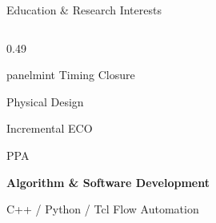 \documentclass[aspectratio=169,10pt]{beamer}
\begin{document}
\begin{frame}{Education \& Research Interests}
\begin{columns}[T,onlytextwidth]
\begin{column}{0.49\textwidth}
\begin{beamercolorbox}[rounded=true,sep=0.20cm,wd=\linewidth]{panelmint}
        {\normalsize Timing Closure}\par
        {\normalsize Physical Design}\par
        {\normalsize Incremental ECO}\par
        {\normalsize PPA}\par
        \vspace{0.15cm}
        {\normalsize\bfseries Algorithm \& Software Development}\par
        \vspace{0.09cm}
        {\normalsize C++ / Python / Tcl Flow Automation}\par
      \end{beamercolorbox}
    \end{column}
  \end{columns}
  \vfill
\end{frame}
\end{document}
